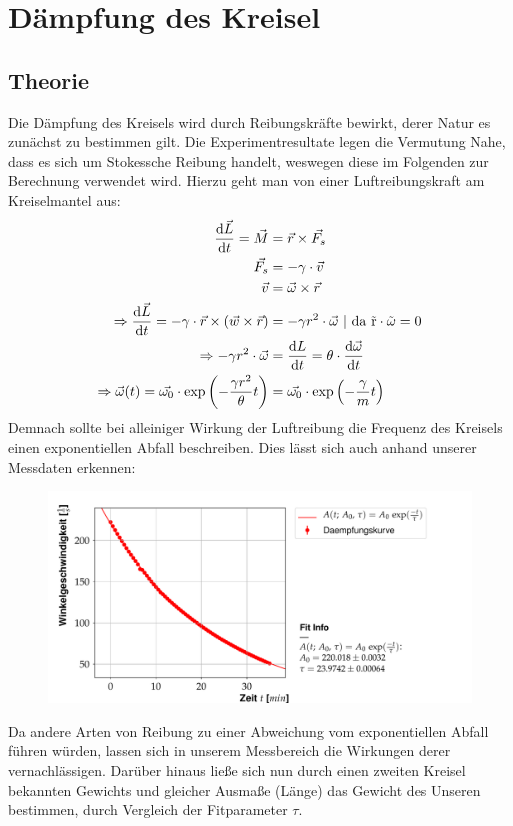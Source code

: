\documentclass{include/protokollclass}
\begin{document}
    
    \chapter{Dämpfung des Kreisel}
    
    \section{Theorie}
    Die Dämpfung des Kreisels wird durch Reibungskräfte bewirkt, derer Natur es zunächst zu bestimmen gilt. Die Experimentresultate legen die Vermutung Nahe, dass es sich um Stokessche Reibung handelt, weswegen diese im Folgenden zur Berechnung verwendet wird. Hierzu geht man von einer Luftreibungskraft am Kreiselmantel aus:
    \begin{align}
        \frac{\d \vec{L}}{\d t} = \vec{M} &= \vec{r} \times \vec{F_s} \\
        \vec{F_s} &= -\gamma \cdot \vec{v} \\
        \vec{v} &= \vec{\omega} \times \vec{r} \\
        \Rightarrow \frac{\d \vec{L}}{\d t} = -\gamma \cdot \vec{r} \times (\vec{w} \times \vec{r}) &= - \gamma r^2\cdot \vec{\omega} \ | \ \mathrm{da\ \vec{r} \cdot \vec{\omega} = 0} \\
        \Rightarrow -\gamma r^2 \cdot \vec{\omega} &= \frac{\d L}{\d t} = \theta \cdot \frac{\d \vec{\omega}}{\d t} \\
        \Rightarrow \vec{\omega}(t) = \vec{\omega_0} \cdot \exp{\left(-\frac{\gamma r^2}{\theta} t\right)} &= \vec{\omega_0} \cdot \exp{\left(-\frac{\gamma}{m} t\right)}
    \end{align}
    Demnach sollte bei alleiniger Wirkung der Luftreibung die Frequenz des Kreisels einen exponentiellen Abfall beschreiben. Dies lässt sich auch anhand unserer Messdaten erkennen:
    \begin{figure}[H]
    \includegraphics[scale=0.45]{fig/kafe_daempfungskurve.pdf}
    \end{figure}
    Da andere Arten von Reibung zu einer Abweichung vom exponentiellen Abfall führen würden, lassen sich in unserem Messbereich die Wirkungen derer vernachlässigen. Darüber hinaus ließe sich nun durch einen zweiten Kreisel bekannten Gewichts und gleicher Ausmaße (Länge) das Gewicht des Unseren bestimmen, durch Vergleich der Fitparameter $\tau$.
    
\end{document}
